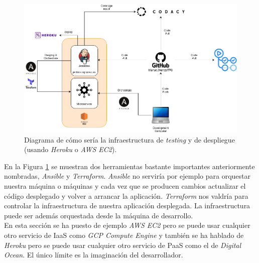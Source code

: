 \begin{figure}[H]
  \centering
  \includegraphics[width=1.\linewidth]{imagenes/07_Despliegue/TFGdiagrams-CICD.png} 
  \caption{Diagrama de cómo sería la infraestructura de \textit{testing} y de despliegue (usando \textit{Heroku} o \textit{AWS EC2}).}
  \label{fig:cicd}
\end{figure}

En la Figura \ref{fig:cicd} se muestran dos herramientas bastante importantes anteriormente nombradas, \textit{Ansible} y \textit{Terraform}. \textit{Ansible} no serviría por ejemplo para orquestar nuestra máquina o máquinas y cada vez que se producen cambios actualizar el código desplegado y volver a arrancar la aplicación. \textit{Terraform} nos valdría para controlar la infraestructura de nuestra aplicación desplegada. La infraestructura puede ser además orquestada desde la máquina de desarrollo.\\

En esta sección se ha puesto de ejemplo \textit{AWS EC2} pero se puede usar cualquier otro servicio de IaaS como \textit{GCP Compute Engine} y también se ha hablado de \textit{Heroku} pero se puede usar cualquier otro servicio de PaaS como el de \textit{Digital Ocean}. El único límite es la imaginación del desarrollador.\\

